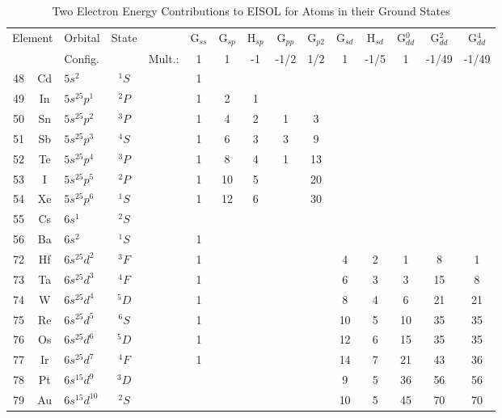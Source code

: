 \begin{table}
\caption{Two Electron Energy Contributions to EISOL for Atoms in their Ground 
States}
\begin{center}
\compresstable
\begin{tabular}{cclcccccccccccc} \hline
\multicolumn{2}{c}{Element}  &  Orbital & State& &
G$_{ss}$ & G$_{sp}$&H$_{sp}$& G$_{pp}$ &G$_{p2}$ &G$_{sd}$&
H$_{sd}$&G$_{dd}^0$&G$_{dd}^2$& G$_{dd}^4$\\ 
&   & Config.& & Mult.: & 1  & 1  &-1 & -1/2&1/2 &  1& -1/5 &1 &-1/49&-1/49\\
\hline
48&Cd & $5s^2     $&$^1S$&& 1  &    &   &     &    &   &   &    &    &     \\ 
49&In & $5s^25p^1$ &$^2P$&& 1  & 2  & 1 &     &    &   &   &    &    &     \\
50&Sn & $5s^25p^2$ &$^3P$&& 1  & 4  & 2 &  1  &3   &   &   &    &    &     \\
51&Sb & $5s^25p^3$ &$^4S$&& 1  & 6  & 3 &  3  &9   &   &   &    &    &     \\
52&Te & $5s^25p^4$ &$^3P$&& 1  & 8  & 4 &  1  &13  &   &   &    &    &     \\
53&I  & $5s^25p^5$ &$^2P$&& 1  & 10 & 5 &     &20  &   &   &    &    &     \\
54&Xe & $5s^25p^6$ &$^1S$&& 1  & 12 & 6 &     &30  &   &   &    &    &     \\
55&Cs & $6s^1    $ &$^2S$&&    &    &   &     &    &   &   &    &    &     \\
56&Ba & $6s^2    $ &$^1S$&& 1  &    &   &     &    &   &   &    &    &     \\
72&Hf & $6s^25d^2$ &$^3F$&& 1  &    &   &     &    & 4 & 2 & 1  & 8  & 1   \\
73&Ta & $6s^25d^3$ &$^4F$&& 1  &    &   &     &    & 6 & 3 & 3  & 15 & 8   \\
74&W  & $6s^25d^4$ &$^5D$&& 1  &    &   &     &    & 8 & 4 & 6  & 21 & 21  \\
75&Re & $6s^25d^5$ &$^6S$&& 1  &    &   &     &    &10 & 5 & 10 & 35 & 35  \\
76&Os & $6s^25d^6$ &$^5D$&& 1  &    &   &     &    &12 & 6 & 15 & 35 & 35  \\
77&Ir & $6s^25d^7$ &$^4F$&& 1  &    &   &     &    &14 & 7 & 21 & 43 & 36  \\
78&Pt & $6s^15d^9$ &$^3D$&&    &    &   &     &    & 9 & 5 & 36 & 56 & 56  \\
79&Au & $6s^15d^{10}$&$^2S$&&  &    &   &     &    &10 & 5 & 45 & 70 & 70  \\

\end{tabular}
\end{center}
\end{table}
